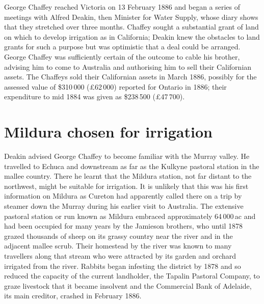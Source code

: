 George Chaffey reached Victoria on 13 February 1886 and began a series
of meetings with Alfred Deakin, then Minister for Water Supply, whose
diary shows that they stretched over three months. Chaffey sought a
substantial grant of land on which to develop irrigation as in
California; Deakin knew the obstacles to land grants for such a
purpose but was optimistic that a deal could be arranged.  George
Chaffey was sufficiently certain of the outcome to cable his brother,
advising him to come to Australia and authorising him to sell their
Californian assets.  The Chaffeys sold their Californian assets in
March 1886, possibly for the assessed value of \$310\,000
(\pounds62\,000) reported for Ontario in 1886; their expenditure to
mid 1884 was given as \$238\,500
(\pounds47\,700).

\section*{Mildura chosen for irrigation}

Deakin advised George Chaffey to become familiar with the Murray
valley.  He travelled to Echuca and downstream as far as the Kulkyne
pastoral station in the mallee country.  There he learnt that the
Mildura station, not far distant to the northwest, might be suitable
for irrigation.  It is unlikely that this was his first information on
Mildura as Cureton had apparently called there on a trip by steamer
down the Murray during his earlier visit to Australia.  The extensive
pastoral station or run known as Mildura embraced approximately
64\,000\,ac and had been occupied for many years by the Jamieson
brothers, who until 1878 grazed thousands of sheep on its grassy
country near the river and in the adjacent mallee scrub.  Their
homestead by the river was known to many travellers along that stream
who were attracted by its garden and orchard irrigated from the river.
Rabbits began infesting the district by 1878 and so reduced the
capacity of the current landholder, the Tapalin Pastoral Company, to
graze livestock that it became insolvent and the Commercial Bank of
Adelaide, its main creditor, crashed in February
1886.

